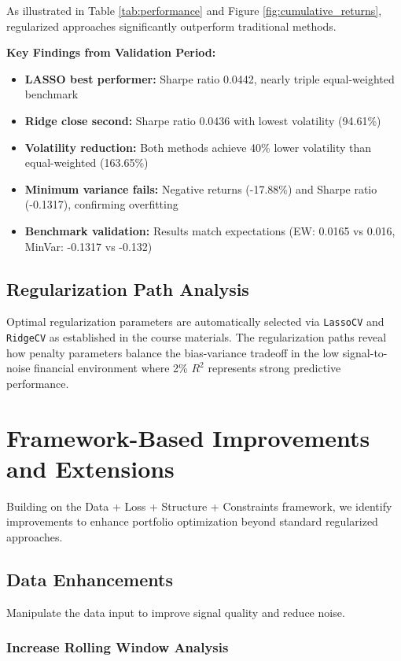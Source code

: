 \documentclass[12pt]{article}
\begin{document}
As illustrated in Table \ref{tab:performance} and Figure \ref{fig:cumulative_returns}, regularized approaches significantly outperform traditional methods.

\textbf{Key Findings from Validation Period:}
\begin{itemize}
    \item \textbf{LASSO best performer:} Sharpe ratio 0.0442, nearly triple equal-weighted benchmark
    \item \textbf{Ridge close second:} Sharpe ratio 0.0436 with lowest volatility (94.61\%)
    \item \textbf{Volatility reduction:} Both methods achieve 40\% lower volatility than equal-weighted (163.65\%)
    \item \textbf{Minimum variance fails:} Negative returns (-17.88\%) and Sharpe ratio (-0.1317), confirming overfitting
    \item \textbf{Benchmark validation:} Results match expectations (EW: 0.0165 vs 0.016, MinVar: -0.1317 vs -0.132)
\end{itemize}

\subsection{Regularization Path Analysis}
Optimal regularization parameters are automatically selected via \texttt{LassoCV} and \texttt{RidgeCV} as established in the course materials. The regularization paths reveal how penalty parameters balance the bias-variance tradeoff in the low signal-to-noise financial environment where 2\% $R^2$ represents strong predictive performance.


\section{Framework-Based Improvements and Extensions}

Building on the Data + Loss + Structure + Constraints framework, we identify improvements to enhance portfolio optimization beyond standard regularized approaches.

\subsection{Data Enhancements}

Manipulate the data input to improve signal quality and reduce noise.

\subsubsection{Increase Rolling Window Analysis}
\end{document}
